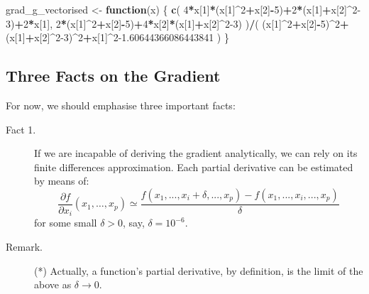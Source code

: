 \documentclass[10pt,b5paper,krantz1]{krantz}
\newenvironment{Shaded}{\begin{snugshade}}{\end{snugshade}}
\newcommand{\ControlFlowTok}[1]{\textcolor[rgb]{0.27,0.27,0.27}{\textbf{#1}}}
\newcommand{\DecValTok}[1]{\textcolor[rgb]{0.06,0.06,0.06}{#1}}
\newcommand{\FloatTok}[1]{\textcolor[rgb]{0.06,0.06,0.06}{#1}}
\newcommand{\KeywordTok}[1]{\textcolor[rgb]{0.27,0.27,0.27}{\textbf{#1}}}
\newcommand{\NormalTok}[1]{#1}
\newcommand{\OperatorTok}[1]{\textcolor[rgb]{0.43,0.43,0.43}{\textbf{#1}}}
\newcommand{\StringTok}[1]{\textcolor[rgb]{0.5,0.5,0.5}{#1}}
\begin{document}
\begin{Shaded}
\begin{Highlighting}[]
\NormalTok{grad_g_vectorised <-}\StringTok{ }\ControlFlowTok{function}\NormalTok{(x) \{}
    \KeywordTok{c}\NormalTok{(}
        \DecValTok{4}\OperatorTok{*}\NormalTok{x[}\DecValTok{1}\NormalTok{]}\OperatorTok{*}\NormalTok{(x[}\DecValTok{1}\NormalTok{]}\OperatorTok{^}\DecValTok{2}\OperatorTok{+}\NormalTok{x[}\DecValTok{2}\NormalTok{]}\OperatorTok{-}\DecValTok{5}\NormalTok{)}\OperatorTok{+}\DecValTok{2}\OperatorTok{*}\NormalTok{(x[}\DecValTok{1}\NormalTok{]}\OperatorTok{+}\NormalTok{x[}\DecValTok{2}\NormalTok{]}\OperatorTok{^}\DecValTok{2-3}\NormalTok{)}\OperatorTok{+}\DecValTok{2}\OperatorTok{*}\NormalTok{x[}\DecValTok{1}\NormalTok{],}
        \DecValTok{2}\OperatorTok{*}\NormalTok{(x[}\DecValTok{1}\NormalTok{]}\OperatorTok{^}\DecValTok{2}\OperatorTok{+}\NormalTok{x[}\DecValTok{2}\NormalTok{]}\OperatorTok{-}\DecValTok{5}\NormalTok{)}\OperatorTok{+}\DecValTok{4}\OperatorTok{*}\NormalTok{x[}\DecValTok{2}\NormalTok{]}\OperatorTok{*}\NormalTok{(x[}\DecValTok{1}\NormalTok{]}\OperatorTok{+}\NormalTok{x[}\DecValTok{2}\NormalTok{]}\OperatorTok{^}\DecValTok{2-3}\NormalTok{)}
\NormalTok{    )}\OperatorTok{/}\NormalTok{(}
\NormalTok{        (x[}\DecValTok{1}\NormalTok{]}\OperatorTok{^}\DecValTok{2}\OperatorTok{+}\NormalTok{x[}\DecValTok{2}\NormalTok{]}\OperatorTok{-}\DecValTok{5}\NormalTok{)}\OperatorTok{^}\DecValTok{2}\OperatorTok{+}\NormalTok{(x[}\DecValTok{1}\NormalTok{]}\OperatorTok{+}\NormalTok{x[}\DecValTok{2}\NormalTok{]}\OperatorTok{^}\DecValTok{2-3}\NormalTok{)}\OperatorTok{^}\DecValTok{2}\OperatorTok{+}\NormalTok{x[}\DecValTok{1}\NormalTok{]}\OperatorTok{^}\DecValTok{2}\FloatTok{-1.60644366086443841}
\NormalTok{    )}
\NormalTok{\}}
\end{Highlighting}
\end{Shaded}

\hypertarget{three-facts-on-the-gradient}{%
\subsection{Three Facts on the Gradient}\label{three-facts-on-the-gradient}}

For now, we should emphasise three important facts:

\bigskip

\begin{description}
\item[Fact 1.]
If we are incapable of deriving the gradient analytically,
we can rely on its finite differences approximation.
Each partial derivative can be estimated by means of:
\[
\frac{\partial f}{\partial x_i}(x_1,\dots,x_p) \simeq
\frac{
f(x_1,...,x_i+\delta,...,x_p)-f(x_1,...,x_i,...,x_p)
}{
\delta
}
\]
for some small \(\delta>0\), say, \(\delta=10^{-6}\).
\item[Remark.]
(*) Actually, a function's partial derivative, by definition,
is the limit of the above as \(\delta\to 0\).
\end{description}
\end{document}
